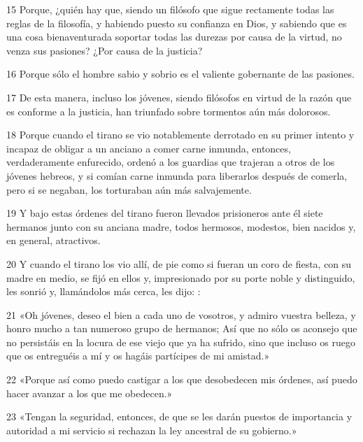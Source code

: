 \par 15 Porque, ¿quién hay que, siendo un filósofo que sigue rectamente todas las reglas de la filosofía, y habiendo puesto su confianza en Dios, y sabiendo que es una cosa bienaventurada soportar todas las durezas por causa de la virtud, no venza sus pasiones? ¿Por causa de la justicia?

\par 16 Porque sólo el hombre sabio y sobrio es el valiente gobernante de las pasiones.

\par 17 De esta manera, incluso los jóvenes, siendo filósofos en virtud de la razón que es conforme a la justicia, han triunfado sobre tormentos aún más dolorosos.

\par 18 Porque cuando el tirano se vio notablemente derrotado en su primer intento y incapaz de obligar a un anciano a comer carne inmunda, entonces, verdaderamente enfurecido, ordenó a los guardias que trajeran a otros de los jóvenes hebreos, y si comían carne inmunda para liberarlos después de comerla, pero si se negaban, los torturaban aún más salvajemente.

\par 19 Y bajo estas órdenes del tirano fueron llevados prisioneros ante él siete hermanos junto con su anciana madre, todos hermosos, modestos, bien nacidos y, en general, atractivos.

\par 20 Y cuando el tirano los vio allí, de pie como si fueran un coro de fiesta, con su madre en medio, se fijó en ellos y, impresionado por su porte noble y distinguido, les sonrió y, llamándolos más cerca, les dijo: :

\par 21 «Oh jóvenes, deseo el bien a cada uno de vosotros, y admiro vuestra belleza, y honro mucho a tan numeroso grupo de hermanos; Así que no sólo os aconsejo que no persistáis en la locura de ese viejo que ya ha sufrido, sino que incluso os ruego que os entreguéis a mí y os hagáis partícipes de mi amistad.»

\par 22 «Porque así como puedo castigar a los que desobedecen mis órdenes, así puedo hacer avanzar a los que me obedecen.»

\par 23 «Tengan la seguridad, entonces, de que se les darán puestos de importancia y autoridad a mi servicio si rechazan la ley ancestral de su gobierno.»

